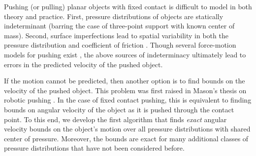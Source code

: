 \documentclass[conference]{IEEEtran}
\newcommand{\TODO}[1]{{\color{red} {{#1}}  }}
\begin{document}




Pushing (or pulling) planar objects with fixed contact is difficult to
model in both theory and practice. First, pressure distributions of
objects are statically indeterminant (barring the case of three-point
support with known center of mass). Second, surface imperfections lead
to spatial variability in both the pressure distribution and
coefficient of friction \cite{YuBFR16}. Though several force-motion
models for pushing exist
\cite{zhou2016convex,howe1996practical,goyal1991planar}, the above
sources of indeterminacy ultimately lead to errors in the predicted
velocity of the pushed object.

If the motion cannot be predicted, then another option is to find
bounds on the velocity of the pushed object. This problem was first
raised in Mason's thesis on robotic pushing \cite{Mason1982}. In the
case of fixed contact pushing, this is equivalent to finding bounds on
angular velocity of the object as it is pushed through the contact
point. To this end, we develop the first algorithm that finds
\textit{exact} angular velocity bounds on the object's motion over all
pressure distributions with shared center of pressure. Moreover, the
bounds are exact for many additional classes of pressure distributions
that have not been considered before.
\end{document}
